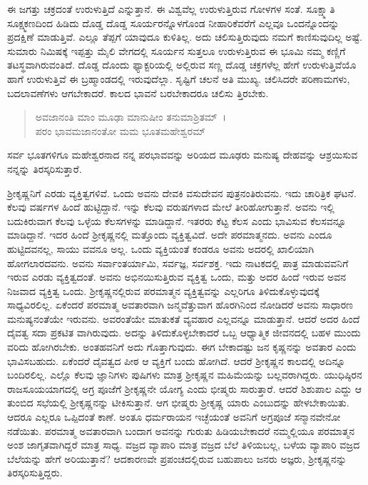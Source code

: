 ಈ ಜಗತ್ತು ಚಕ್ರದಂತೆ ಉರುಳುತ್ತಿದೆ ಎನ್ನುತ್ತಾನೆ. ಈ ವಿಶ್ವವೆಲ್ಲ ಉರುಳುತ್ತಿರುವ ಗೋಳಗಳ ಸಂತೆ. ಸೂಕ್ಷ್ಮಾತಿ ಸೂಕ್ಷ್ಮಕಣದಿಂದ ಹಿಡಿದು ದೊಡ್ಡ ದೊಡ್ಡ ಸೂರ್ಯರನ್ನೊಳಗೊಂಡ ನೀಹಾರಿಕೆವರೆಗೆ ಎಲ್ಲವೂ ಒಂದನ್ನೊಂದನ್ನು ಪ್ರದಕ್ಷಿಣೆ ಮಾಡುತ್ತಿವೆ. ಎಲ್ಲೂ ತೆಪ್ಪಗೆ ಯಾವುದೂ ಕುಳಿತಿಲ್ಲ. ಅದು ಚಲಿಸುತ್ತಿರುವುದು ನಮಗೆ ಕಾಣಿಸುವುದಿಲ್ಲ ಅಷ್ಟೆ. ಸುಮಾರು ನಿಮಿಷಕ್ಕೆ ಇಪ್ಪತ್ತು ಮೈಲಿ ವೇಗದಲ್ಲಿ ಸೂರ್ಯನ ಸುತ್ತಲೂ ಉರುಳುತ್ತಿರುವ ಈ ಭೂಮಿ ನಮ್ಮ ಕಣ್ಣಿಗೆ ತಟಸ್ಥವಾಗಿರುವಂತಿದೆ. ದೊಡ್ಡ ದೊಂದು ಫ್ಯಾಕ್ಟರಿಯಲ್ಲಿ ಅಲ್ಲಿರುವ ಸಣ್ಣ ದೊಡ್ಡ ಚಕ್ರಗಳೆಲ್ಲ ಹೇಗೆ ಉರುಳುತ್ತಿವೆಯೊ ಹಾಗೆ ಉರುಳುತ್ತಿವೆ ಈ ಬ್ರಹ್ಮಾಂಡದಲ್ಲಿ ಇರುವುದೆಲ್ಲಾ. ಸೃಷ್ಟಿಗೆ ಚಲನೆ ಅತಿ ಮುಖ್ಯ. ಚಲಿಸಿದರೇ ಪರಿಣಾಮಗಳು, ಬದಲಾವಣೆಗಳು ಆಗಬೇಕಾದರೆ. ಕಾಲದ ಭಾವನೆ ಬರಬೇಕಾದರೂ ಚಲಿಸು ತ್ತಿರಬೇಕು.

\begin{verse}
ಅವಜಾನಂತಿ ಮಾಂ ಮೂಢಾ ಮಾನುಷೀಂ ತನುಮಾಶ್ರಿತಮ್~।\\ಪರಂ ಭಾವಮಜಾನಂತೋ ಮಮ ಭೂತಮಹೇಶ್ವರಮ್ 
\end{verse}

{\small ಸರ್ವ ಭೂತಗಳಿಗೂ ಮಹೇಶ್ವರನಾದ ನನ್ನ ಪರಭಾವವನ್ನು ಅರಿಯದ ಮೂಢರು ಮನುಷ್ಯ ದೇಹವನ್ನು ಆಶ್ರಯಿಸುವ ನನ್ನನ್ನು ತಿರಸ್ಕರಿಸುತ್ತಾರೆ.}

ಶ‍್ರೀಕೃಷ್ಣನಿಗೆ ಎರಡು ವ್ಯಕ್ತಿತ್ವಗಳಿವೆ. ಒಂದು ಅವನು ದೇವಕಿ ವಸುದೇವನ ಪುತ್ರನಂತಿರುವನು. ಇದು ಚಾರಿತ್ರಿಕ ಘಟನೆ. ಕೆಲವು ವರ್ಷಗಳ ಹಿಂದೆ ಹುಟ್ಟಿದ್ದಾನೆ. ಇನ್ನು ಕೆಲವು ವರುಷಗಳಾದ ಮೇಲೆ ತೀರಿಹೋಗುತ್ತಾನೆ. ಅವನು ಇಲ್ಲಿ ಬದುಕಿರುವಾಗ ಕೆಲವು ಒಳ್ಳೆಯ ಕೆಲಸಗಳನ್ನು ಮಾಡಿದ್ದಾನೆ. ಇತರರು ಕೆಟ್ಟ ಕೆಲಸ ಎಂದು ಭಾವಿಸುವ ಕೆಲಸವನ್ನೂ ಮಾಡಿದ್ದಾನೆ. ಇದರ ಹಿಂದೆ ಶ‍್ರೀಕೃಷ್ಣನಲ್ಲಿ ಮತ್ತೊಂದು ವ್ಯಕ್ತಿತ್ವವಿದೆ. ಅದೇ ಪರಮಾತ್ಮನದು. ಅವನು ಎಂದೂ ಹುಟ್ಟಿದವನಲ್ಲ, ಸಾಯು ವವನೂ ಅಲ್ಲ. ಒಂದು ವ್ಯಕ್ತಿಯಂತೆ ಕಂಡರೂ ಅವನು ಅದರಲ್ಲಿ ಖಾಲಿಯಾಗಿ ಹೋಗಲಾರದವನು. ಅವನು ಸರ್ವಾಂತರ್ಯಾಮಿ, ಸರ್ವಜ್ಞ, ಸರ್ವಶಕ್ತ. ಇದು ನಾಟಕದಲ್ಲಿ ಪಾತ್ರ ಮಾಡುವವನಿಗೆ ಇರುವ ಎರಡು ವ್ಯಕ್ತಿತ್ವದಂತೆ. ಅವನು ಅಭಿನಯಿಸುತ್ತಿರುವ ವ್ಯಕ್ತಿತ್ವ ಒಂದು, ಮತ್ತು ಅದರ ಹಿಂದೆ ಇರುವ ಅವನ ನಿಜವಾದ ವ್ಯಕ್ತಿತ್ವ ಒಂದು. ಶ‍್ರೀಕೃಷ್ಣನಲ್ಲಿರುವ ಪರಮಾತ್ಮನ ವ್ಯಕ್ತಿತ್ವವನ್ನು ಎಲ್ಲರಿಗೂ ತಿಳಿದುಕೊಳ್ಳುವುದಕ್ಕೆ ಸಾಧ್ಯವಿರಲಿಲ್ಲ. ಏಕೆಂದರೆ ಪರಮಾತ್ಮ ಅವತಾರವಾಗಿ ಜನ್ಮವೆತ್ತುವಾಗ ಹೊರಗಿನಿಂದ ನೋಡಿದರೆ ಅವನು ಸಾಧಾರಣ ಮನುಷ್ಯನಂತೆಯೇ ಇರುವನು. ಅವರಂತೆಯೇ ಮಾತುಕತೆ ವ್ಯವಹಾರ ಎಲ್ಲವನ್ನೂ ಮಾಡುತ್ತಾನೆ. ಆದರೆ ಅದರ ಹಿಂದೆ ದೈವತ್ವ ಸದಾ ಪ್ರಕಟಿತ ವಾಗಿರುವುದು. ಅದನ್ನು ತಿಳಿದುಕೊಳ್ಳಬೇಕಾದರೆ ಒಬ್ಬ ಆಧ್ಯಾತ್ಮಿಕ ಜೀವನದಲ್ಲಿ ಬಹಳ ಮುಂದು ವರಿದು ಹೋಗಿರಬೇಕು. ಅಂತಹವನಿಗೆ ಅದು ಗೊತ್ತಾಗುವುದು. ಈಗ ಬೇಕಾದಷ್ಟು ಜನ ಕೃಷ್ಣನನ್ನು ಅವತಾರ ಎಂದು ಭಾವಿಸಬಹುದು. ಏಕೆಂದರೆ ದೈವತ್ವದ ಪೀಠ ಆ ವ್ಯಕ್ತಿಗೆ ಬಂದು ಹೋಗಿದೆ. ಆದರೆ ಶ‍್ರೀಕೃಷ್ಣನ ಕಾಲದಲ್ಲಿ ಅದಿನ್ನೂ ಬಂದಿರಲಿಲ್ಲ. ಎಲ್ಲೊ ಕೆಲವು ಜ್ಞಾನಿಗಳು ಪುಷಿಗಳು ಮಾತ್ರ ಶ‍್ರೀಕೃಷ್ಣನ ಮಹಿಮೆಯನ್ನು ಬಲ್ಲವರಾಗಿದ್ದರು. ಯುಧಿಷ್ಠಿರನ ರಾಜಸೂಯಯಾಗದಲ್ಲಿ ಅಗ್ರ ಪೂಜೆಗೆ ಶ‍್ರೀಕೃಷ್ಣನೇ ಯೋಗ್ಯ ಎಂದು ಭೀಷ್ಮರು ಸಾರುತ್ತಾರೆ. ಆದರೆ ಶಿಶುಪಾಲ ಎದ್ದು ಆ ತುಂಬಿದ ಸಭೆಯಲ್ಲಿ ಶ‍್ರೀಕೃಷ್ಣನನ್ನು ಟೀಕಿಸುತ್ತಾನೆ. ಆಗ ಭೀಷ್ಮರು ಶ‍್ರೀಕೃಷ್ಣ ಯಾರು ಎಂಬುದನ್ನು ಹೇಳಬೇಕಾಯಿತು. ಆದರೂ ಎಲ್ಲರೂ ಒಪ್ಪಿದಂತೆ ಕಾಣೆ. ಅಂತೂ ಧರ್ಮರಾಯನ ಇಚ್ಛೆಯಂತೆ ಅವನಿಗೆ ಅಗ್ರಪೂಜೆ ಸನ್ಮಾನವೇನೋ ನಡೆಯಿತು. ಪರಮಾತ್ಮ ಅವತಾರವಾಗಿ ಬಂದಾಗ ಅವನನ್ನು ಗುರುತು ಹಿಡಿಯಬೇಕಾದರೆ ನಮ್ಮಲ್ಲಿಯೂ ಪರಮಾತ್ಮನ ಅಂಶ ಜಾಗೃತವಾಗಿದ್ದರೆ ಮಾತ್ರ ಸಾಧ್ಯ. ವಜ್ರದ ವ್ಯಾಪಾರಿ ಮಾತ್ರ ವಜ್ರದ ಬೆಲೆ ತಿಳಿಯಬಲ್ಲ, ಬಳೆಯ ವ್ಯಾಪಾರಿ ವಜ್ರದ ಬೆಲೆಯನ್ನು ಹೇಗೆ ಅರಿಯುತ್ತಾನೆ? ಆದಕಾರಣವೇ ಪ್ರಪಂಚದಲ್ಲಿರುವ ಬಹುಪಾಲು ಜನರು ಅಜ್ಞರು, ಶ‍್ರೀಕೃಷ್ಣನನ್ನು ತಿರಸ್ಕರಿಸುತ್ತಿದ್ದರು.

